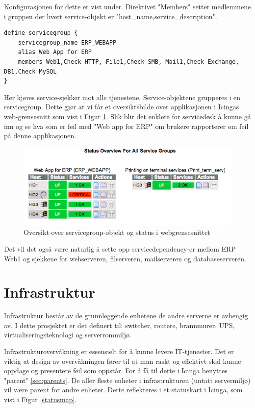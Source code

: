 Konfigurasjonen for dette er vist under. Direktivet "Members" setter medlemmene i gruppen der hvert service-objekt er "host\_name,service\_description".

\begin{lstlisting}[style=example]
define servicegroup {
	servicegroup_name ERP_WEBAPP
	alias Web App for ERP
	members Web1,Check HTTP, File1,Check SMB, Mail1,Check Exchange, DB1,Check MySQL
}
\end{lstlisting}

Her kjøres service-sjekker mot alle tjenestene. Service-objektene grupperes i en servicegroup. Dette gjør at vi får et oversiktsbilde over applikasjonen i Icingas web-grensesnitt som vist i Figur \ref{servicegroup_web}. Slik blir det enklere for servicedesk å kunne gå inn og se hva som er feil med "Web app for ERP" om brukere rapporterer om feil på denne applikasjonen.

\begin{figure}[H]
    \centering
    \includegraphics[scale=0.6]{img/servicegroup_web}
    \caption{ Oversikt over servicegroup-objekt og status i webgrensesnittet}
    \label{servicegroup_web}
\end{figure}

Det vil det også være naturlig å sette opp servicedependency-er mellom ERP Web1 og sjekkene for webserveren, filserveren, mailserveren og databaseserveren.

\section{Infrastruktur}
Infrastruktur består av de grunnleggende enhetene de andre serverne er avhengig av. I dette prosjektet er det definert til: switcher, routere, brannmurer, UPS, virtualiseringsteknologi og serverrommiljø.

Infrastrukturovervåkning er essensielt for å kunne levere IT-tjenester. Det er viktig at design av overvåkningen fører til at man raskt og effektivt skal kunne oppdage og presentere feil som oppstår. For å få til dette i Icinga benyttes "parent" \ref{sec:parents}. De aller fleste enheter i infrastrukturen (untatt servermiljø) vil være parent for andre enheter. Dette reflekteres i et statuskart i Icinga, som vist i Figur \ref{statusmap}.

